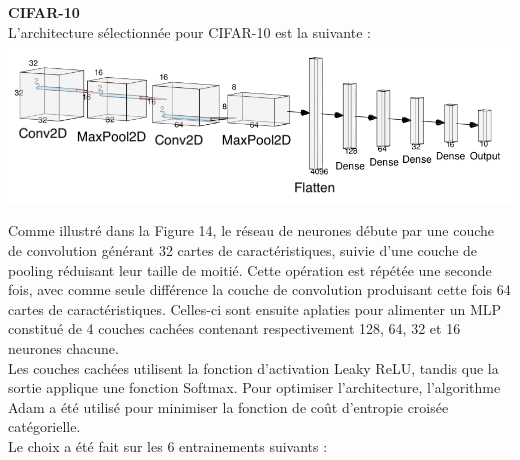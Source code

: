 \begin{multicols}{2}
\textbf{CIFAR-10} \\

L'architecture sélectionnée pour CIFAR-10 est la suivante : \\

\includegraphics[width=\columnwidth]{images/cifar10_nn.png}
\hfill\break


Comme illustré dans la Figure 14, le réseau de neurones débute par une couche de convolution générant 32 cartes de caractéristiques, suivie d’une couche de pooling réduisant leur taille de moitié. 
Cette opération est répétée une seconde fois, avec comme seule différence la couche de convolution produisant cette fois 64 cartes de caractéristiques.
Celles-ci sont ensuite aplaties pour alimenter un MLP constitué de 4 couches cachées contenant respectivement 128, 64, 32 et 16 neurones chacune. \\

Les couches cachées utilisent la fonction d’activation Leaky ReLU, tandis que la sortie 
applique une fonction Softmax. Pour optimiser l'architecture, l’algorithme Adam a été utilisé pour minimiser 
la fonction de coût d’entropie croisée catégorielle. \\

Le choix a été fait sur les 6 entrainements suivants : \\


\end{multicols}
